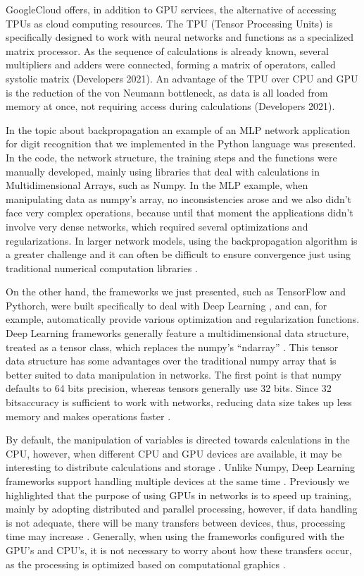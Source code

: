 GoogleCloud offers, in addition to GPU services, the alternative of accessing TPUs as cloud computing resources. The TPU (Tensor Processing Units) is specifically designed to work with neural networks and functions as a specialized matrix processor. As the sequence of calculations is already known, several multipliers and adders were connected, forming a matrix of operators, called systolic matrix (Developers 2021). An advantage of the TPU over CPU and GPU is the reduction of the von Neumann bottleneck, as data is all loaded from memory at once, not requiring access during calculations (Developers 2021).

In the topic about backpropagation an example of an MLP network application for digit recognition that we implemented in the Python language was presented. In the code, the network structure, the training steps and the functions were manually developed, mainly using libraries that deal with calculations in Multidimensional Arrays, such as Numpy. In the MLP example, when manipulating data as numpy's array, no inconsistencies arose and we also didn't face very complex operations, because until that moment the applications didn't involve very dense networks, which required several optimizations and regularizations. In larger network models, using the backpropagation algorithm is a greater challenge and it can often be difficult to ensure convergence just using traditional numerical computation libraries \cite{adrian2017}.

On the other hand, the frameworks we just presented, such as TensorFlow and Pythorch, were built specifically to deal with Deep Learning , and can, for example, automatically provide various optimization and regularization functions. Deep Learning  frameworks generally feature a multidimensional data structure, treated as a tensor class, which replaces the numpy’s “ndarray” \cite{zhang2020dive}. This tensor data structure has some advantages over the traditional numpy array that is better suited to data manipulation in networks. The first point is that numpy defaults to 64 bits precision, whereas tensors generally use 32 bits. Since 32 bitsaccuracy is sufficient to work with networks, reducing data size takes up less memory and makes operations faster \cite{geron2019}.

By default, the manipulation of variables is directed towards calculations in the CPU, however, when different CPU and GPU devices are available, it may be interesting to distribute calculations and storage \cite{zhang2020dive}. Unlike Numpy, Deep Learning  frameworks support handling multiple devices at the same time \cite{zhang2020dive}. Previously we highlighted that the purpose of using GPUs in networks is to speed up training, mainly by adopting distributed and parallel processing, however, if data handling is not adequate, there will be many transfers between devices, thus, processing time may increase \cite{zhang2020dive}. Generally, when using the frameworks configured with the GPU's and CPU's, it is not necessary to worry about how these transfers occur, as the processing is optimized based on computational graphics \cite{geron2019}.

